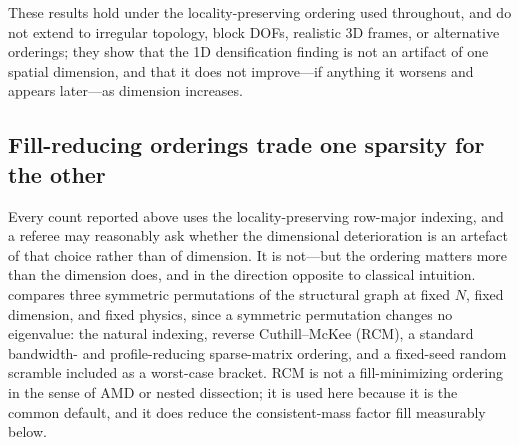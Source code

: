 \documentclass{ieeeaccess}
\begin{document}
These results hold under the locality-preserving ordering used throughout, and do not extend to irregular topology, block DOFs, realistic 3D frames, or alternative orderings; they show that the 1D densification finding is not an artifact of one spatial dimension, and that it does not improve---if anything it worsens and appears later---as dimension increases.

\subsection{Fill-reducing orderings trade one sparsity for the other}
\label{sec:ordering}

Every count reported above uses the locality-preserving row-major indexing, and a referee may
reasonably ask whether the dimensional deterioration is an artefact of that choice rather than
of dimension. It is not---but the ordering matters more than the dimension does, and in the
direction opposite to classical intuition.  compares three symmetric
permutations of the structural graph at fixed $N$, fixed dimension, and fixed physics, since a
symmetric permutation changes no eigenvalue: the natural indexing, reverse Cuthill--McKee
(RCM), a standard bandwidth- and profile-reducing sparse-matrix ordering, and a fixed-seed random
scramble included as a worst-case bracket. RCM is not a fill-minimizing ordering in the sense of
AMD or nested dissection; it is used here because it is the common default, and it does reduce
the consistent-mass factor fill measurably below.
\end{document}
